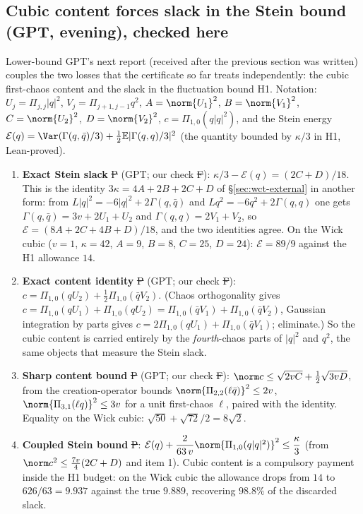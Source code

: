 \subsection{Cubic content forces slack in the Stein bound (GPT, evening), checked here}\label{sec:wct-stein}
Lower-bound GPT's next report (received after the previous section was written) couples the two losses that the certificate so far treats independently: the cubic
first-chaos content and the slack in the fluctuation bound H1. Notation: $U_j=\Pi_{j,j}|q|^2$, $V_j=\Pi_{j+1,j-1}q^2$, $A=\norm{U_1}^2$, $B=\norm{V_1}^2$, $C=\norm{U_2}^2$, $D=\norm{V_2}^2$,
$c=\Pi_{1,0}(q|q|^2)$, and the Stein energy $\mathcal E(q)=\Var(\Gamma(q,\bar q)/3)+\tfrac12\E|\Gamma(q,q)/3|^2$ (the quantity bounded by $\kappa/3$ in H1, Lean-proved).
\begin{enumerate}
\item \textbf{Exact Stein slack} \st{P} (GPT; our check \st{F}): $\kappa/3-\mathcal E(q)=(2C+D)/18$. This is the identity $3\kappa=4A+2B+2C+D$ of \S\ref{sec:wct-external} in another form:
from $L|q|^2=-6|q|^2+2\Gamma(q,\bar q)$ and $Lq^2=-6q^2+2\Gamma(q,q)$ one gets $\Gamma(q,\bar q)=3v+2U_1+U_2$ and $\Gamma(q,q)=2V_1+V_2$, so $\mathcal E=(8A+2C+4B+D)/18$, and the two identities
agree. On the Wick cubic ($v=1$, $\kappa=42$, $A=9$, $B=8$, $C=25$, $D=24$): $\mathcal E=89/9$ against the H1 allowance $14$.
\item \textbf{Exact content identity} \st{P} (GPT; our check \st{F}): $c=\Pi_{1,0}(qU_2)+\tfrac12\Pi_{1,0}(\bar qV_2)$. (Chaos orthogonality gives $c=\Pi_{1,0}(qU_1)+\Pi_{1,0}(qU_2)=\Pi_{1,0}(\bar qV_1)+\Pi_{1,0}(\bar qV_2)$,
Gaussian integration by parts gives $c=2\Pi_{1,0}(qU_1)+\Pi_{1,0}(\bar qV_1)$; eliminate.) So the cubic content is carried entirely by the \emph{fourth}-chaos parts of $|q|^2$ and $q^2$, the same
objects that measure the Stein slack.
\item \textbf{Sharp content bound} \st{P} (GPT; our check \st{F}): $\norm c\le\sqrt{2vC}+\tfrac12\sqrt{3vD}$, from the creation-operator bounds $\norm{\Pi_{2,2}(\ell\bar q)}^2\le2v$,
$\norm{\Pi_{3,1}(\ell q)}^2\le3v$ for a unit first-chaos $\ell$, paired with the identity. Equality on the Wick cubic: $\sqrt{50}+\sqrt{72}/2=8\sqrt2$.
\item \textbf{Coupled Stein bound} \st{P}: $\mathcal E(q)+\dfrac{2}{63\,v}\norm{\Pi_{1,0}(q|q|^2)}^2\le\dfrac\kappa3$ (from $\norm c^2\le\frac{7v}4(2C+D)$ and item 1). Cubic content is a
compulsory payment inside the H1 budget: on the Wick cubic the allowance drops from $14$ to $626/63=9.937$ against the true $9.889$, recovering $98.8\%$ of the discarded slack.
\end{enumerate}
